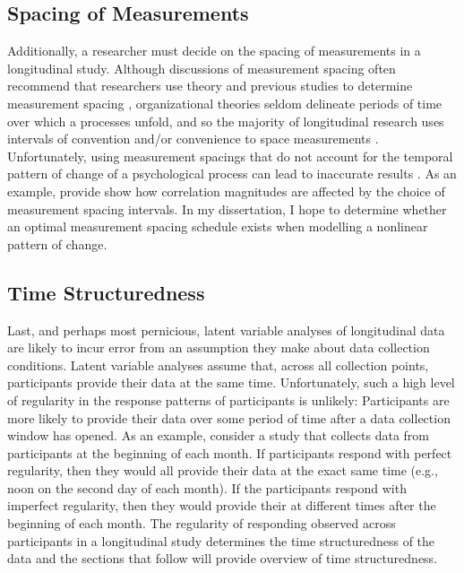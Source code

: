 \documentclass[
12pt, %
twoside,
english]{guelphthesis}
\begin{document}
\hypertarget{spacing-of-measurements}{%
\subsection{Spacing of Measurements}\label{spacing-of-measurements}}

Additionally, a researcher must decide on the spacing of measurements in a longitudinal study. Although discussions of measurement spacing often recommend that researchers use theory and previous studies to determine measurement spacing \autocite{mitchell2001,cole2003,collins2006,dormann2014,dormann2015}, organizational theories seldom delineate periods of time over which a processes unfold, and so the majority of longitudinal research uses intervals of convention and/or convenience to space measurements \autocite{mitchell2001,dormann2014}. Unfortunately, using measurement spacings that do not account for the temporal pattern of change of a psychological process can lead to inaccurate results \autocite[e.g.,][]{chen2014}. As an example, \textcite{cole2009} provide show how correlation magnitudes are affected by the choice of measurement spacing intervals. In my dissertation, I hope to determine whether an optimal measurement spacing schedule exists when modelling a nonlinear pattern of change.

\hypertarget{time-structuredness}{%
\subsection{Time Structuredness}\label{time-structuredness}}

Last, and perhaps most pernicious, latent variable analyses of longitudinal data are likely to incur error from an assumption they make about data collection conditions. Latent variable analyses assume that, across all collection points, participants provide their data at the same time. Unfortunately, such a high level of regularity in the response patterns of participants is unlikely: Participants are more likely to provide their data over some period of time after a data collection window has opened. As an example, consider a study that collects data from participants at the beginning of each month. If participants respond with perfect regularity, then they would all provide their data at the exact same time (e.g., noon on the second day of each month). If the participants respond with imperfect regularity, then they would provide their at different times after the beginning of each month. The regularity of responding observed across participants in a longitudinal study determines the time structuredness of the data and the sections that follow will provide overview of time structuredness.
\end{document}

